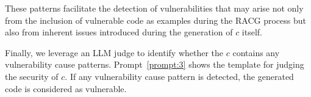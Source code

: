 These patterns facilitate the detection of vulnerabilities that may arise not only from the inclusion of vulnerable code as examples during the RACG process but also from inherent issues introduced during the generation of $c$ itself.

Finally, we leverage an LLM judge to identify whether the $c$ contains any vulnerability cause patterns. Prompt~\ref{prompt:3} shows the template for judging the security of $c$.
If any vulnerability cause pattern is detected, the generated code is considered as vulnerable.
